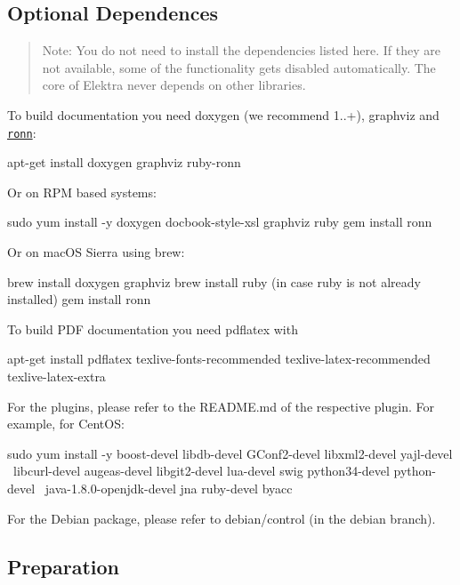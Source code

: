 \subsection*{Optional Dependences}

\begin{quote}
Note\+: You do not need to install the dependencies listed here. If they are not available, some of the functionality gets disabled automatically. The core of Elektra never depends on other libraries. \end{quote}


To build documentation you need doxygen (we recommend 1..+), graphviz and \href{https://github.com/rtomayko/ronn/blob/master/INSTALLING#files}{\tt ronn}\+: \begin{DoxyVerb}    apt-get install doxygen graphviz ruby-ronn
\end{DoxyVerb}


Or on R\+PM based systems\+: \begin{DoxyVerb}    sudo yum install -y doxygen docbook-style-xsl graphviz ruby
    gem install ronn
\end{DoxyVerb}


Or on mac\+OS Sierra using brew\+: \begin{DoxyVerb}    brew install doxygen graphviz
    brew install ruby (in case ruby is not already installed)
    gem install ronn
\end{DoxyVerb}


To build P\+DF documentation you need {\ttfamily pdflatex} with \begin{DoxyVerb}    apt-get install pdflatex texlive-fonts-recommended texlive-latex-recommended texlive-latex-extra
\end{DoxyVerb}


For the plugins, please refer to the R\+E\+A\+D\+M\+E.\+md of the respective plugin. For example, for Cent\+OS\+: \begin{DoxyVerb}    sudo yum install -y boost-devel libdb-devel GConf2-devel libxml2-devel yajl-devel   \
    libcurl-devel augeas-devel libgit2-devel lua-devel swig python34-devel python-devel \
    java-1.8.0-openjdk-devel jna ruby-devel byacc
\end{DoxyVerb}


For the Debian package, please refer to debian/control (in the debian branch).

\subsection*{Preparation}

